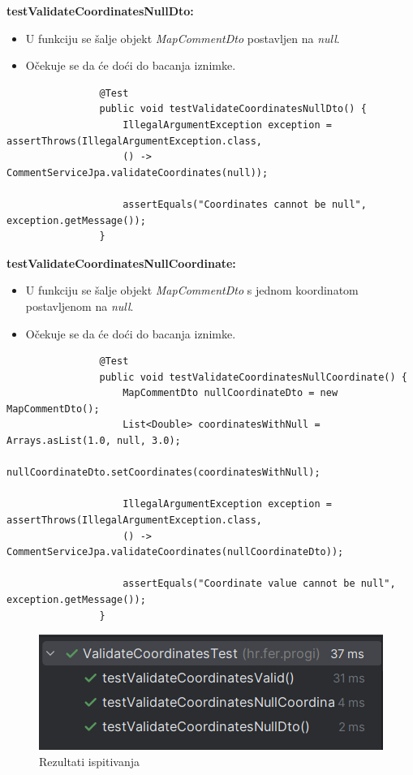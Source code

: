 			\textbf{testValidateCoordinatesNullDto:}
			\begin{itemize}
				\item U funkciju se šalje objekt \textit{MapCommentDto} postavljen na \textit{null}.
				\item Očekuje se da će doći do bacanja iznimke.
			\end{itemize}
			\begin{lstlisting}
				@Test
				public void testValidateCoordinatesNullDto() {
					IllegalArgumentException exception = assertThrows(IllegalArgumentException.class,
					() -> CommentServiceJpa.validateCoordinates(null));
					
					assertEquals("Coordinates cannot be null", exception.getMessage());
				}
			\end{lstlisting}
			
			\textbf{testValidateCoordinatesNullCoordinate:}
			\begin{itemize}
				\item U funkciju se šalje objekt \textit{MapCommentDto} s jednom koordinatom postavljenom na \textit{null}.
				\item Očekuje se da će doći do bacanja iznimke.
			\end{itemize}
			\begin{lstlisting}
				@Test
				public void testValidateCoordinatesNullCoordinate() {
					MapCommentDto nullCoordinateDto = new MapCommentDto();
					List<Double> coordinatesWithNull = Arrays.asList(1.0, null, 3.0);
					nullCoordinateDto.setCoordinates(coordinatesWithNull);
					
					IllegalArgumentException exception = assertThrows(IllegalArgumentException.class,
					() -> CommentServiceJpa.validateCoordinates(nullCoordinateDto));
					
					assertEquals("Coordinate value cannot be null", exception.getMessage());
				}
			\end{lstlisting}
			
			\begin{figure}[H]
				\includegraphics[scale=1]{slike/validateCoordinatesTest.png} 
				\centering
				\caption{Rezultati ispitivanja}
				\label{fig:validateCoordinatesTest}
			\end{figure}
			
